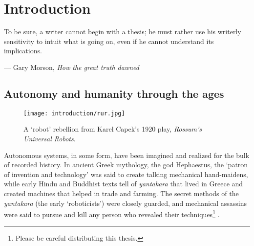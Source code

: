 \chapter{Introduction}
\label{ch:intro}
\epigraph{To be sure, a writer cannot begin with a thesis; he must rather use his writerly sensitivity to intuit what is going on, even if he cannot understand its implications.}{--- Gary Morson, \textit{How the great truth dawned}}
 

\section{Autonomy and humanity through the ages}
\begin{wrapfigure}{r}{0.5\textwidth}
  \begin{center}
  	\vspace{-20pt}
    \texttt{[image: introduction/rur.jpg]}
     \vspace{-15pt}
  \end{center}
  \caption{A `robot' rebellion from Karel Capek's 1920 play, \textit{Rossum's Universal Robots}.}
  \vspace{-5pt}
  \label{fig:into_rur}
\end{wrapfigure}

Autonomous systems, in some form, have been imagined and realized for the bulk of recorded history. In ancient Greek mythology, the god Hephaestus, the `patron of invention and technology' \citep{MayorGodsRobots2019} was said to create talking mechanical hand-maidens, while early Hindu and Buddhist texts tell of \textit{yantakara} that lived in Greece and created machines that helped in trade and farming. The secret methods of the \textit{yantakara} (the early `roboticists') were closely guarded, and mechanical assassins were said to pursue and kill any person who revealed their techniques\footnote{Please be careful distributing this thesis.} \citep{MayorGodsRobots2019}. \cite{fitzgibbon2007learning} 



